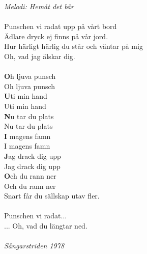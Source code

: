 {\footnotesize\textit{Melodi: Hemåt det bär}}\\
\\
Punschen vi radat upp på vårt bord\\
Ädlare dryck ej finns på vår jord.\\
Hur härligt härlig du står och väntar på mig\\
Oh, vad jag älskar dig.\\
\\
{\textbf Oh ljuva punsch}\\
Oh ljuva punsch\\
{\textbf Uti min hand}\\
Uti min hand\\
{\textbf Nu tar du plats}\\
Nu tar du plats\\
{\textbf I magens famn}\\
I magens famn\\
{\textbf Jag drack dig upp}\\
Jag drack dig upp\\
{\textbf Och du rann ner}\\
Och du rann ner\\
Snart får du sällskap utav fler.\\
\\
Punschen vi radat...\\
... Oh, vad du längtar ned.\\
\\
{\footnotesize\textit{Sångarstriden 1978}}
